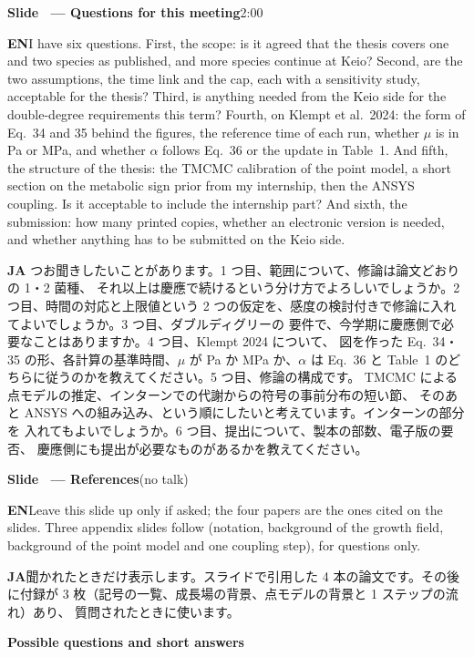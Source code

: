 \documentclass[11pt,a4paper]{article}
\newcounter{sl}
\newcommand{\slide}[2]{\stepcounter{sl}\vspace{8pt}%
  {\color{c3}\large\bfseries Slide \thesl\ --- #1}\hfill{\small #2}\par\vspace{2pt}}
\newcommand{\EN}{\textbf{EN}\quad}
\newcommand{\JA}{\par\textbf{JA}\quad}
\begin{document}
\slide{Questions for this meeting}{2:00}
\EN I have six questions. First, the scope: is it agreed that the thesis
covers one and two species as published, and more species continue
at Keio? Second, are the two assumptions, the time link and the cap, each
with a sensitivity study, acceptable for the thesis? Third, is anything
needed from the Keio side for the double-degree requirements this term?
Fourth, on Klempt et al.\ 2024: the form of Eq.\ 34 and 35 behind the
figures, the reference time of each run, whether $\mu$ is in Pa or MPa, and
whether $\alpha$ follows Eq.\ 36 or the update in Table~1. And fifth, the
structure of the thesis: the TMCMC calibration of the point model, a short
section on the metabolic sign prior from my internship, then the ANSYS
coupling. Is it acceptable to include the internship part? And sixth, the
submission: how many printed copies, whether an electronic version is needed,
and whether anything has to be submitted on the Keio side.
\JA 6 つお聞きしたいことがあります。1 つ目、範囲について、修論は論文どおりの 1・2 菌種、
それ以上は慶應で続けるという分け方でよろしいでしょうか。2 つ目、時間の対応と上限値という
2 つの仮定を、感度の検討付きで修論に入れてよいでしょうか。3 つ目、ダブルディグリーの
要件で、今学期に慶應側で必要なことはありますか。4 つ目、Klempt 2024 について、
図を作った Eq.\ 34・35 の形、各計算の基準時間、$\mu$ が Pa か MPa か、$\alpha$ は
Eq.\ 36 と Table~1 のどちらに従うのかを教えてください。5 つ目、修論の構成です。
TMCMC による点モデルの推定、インターンでの代謝からの符号の事前分布の短い節、
そのあと ANSYS への組み込み、という順にしたいと考えています。インターンの部分を
入れてもよいでしょうか。6 つ目、提出について、製本の部数、電子版の要否、
慶應側にも提出が必要なものがあるかを教えてください。

\slide{References}{(no talk)}
\EN Leave this slide up only if asked; the four papers are the ones cited on
the slides. Three appendix slides follow (notation, background of the growth
field, background of the point model and one coupling step), for questions only.
\JA 聞かれたときだけ表示します。スライドで引用した 4 本の論文です。その後に付録が
3 枚（記号の一覧、成長場の背景、点モデルの背景と 1 ステップの流れ）あり、
質問されたときに使います。

\vspace{12pt}
{\color{c3}\large\bfseries Possible questions and short answers}
\end{document}
